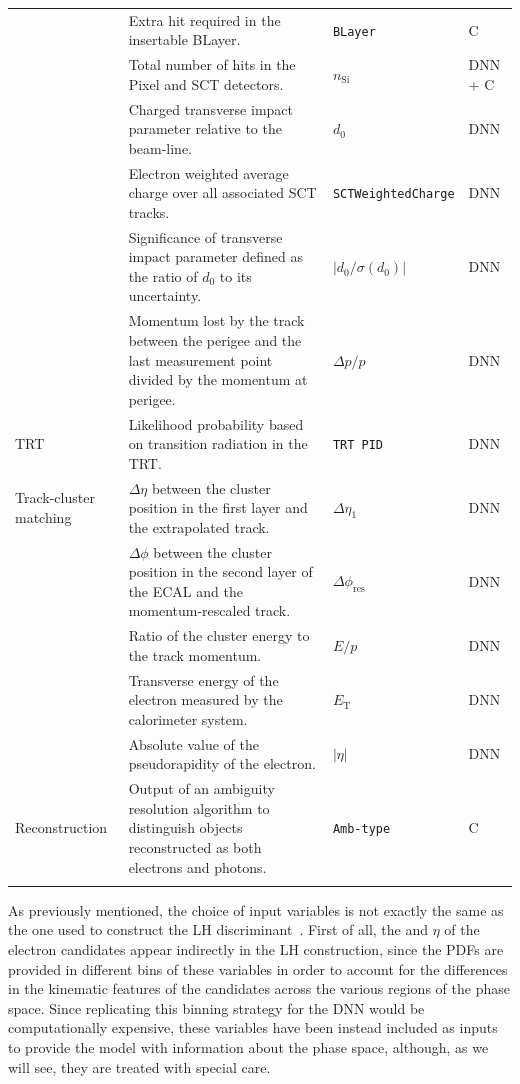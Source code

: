 {\begin{longtable}{p{2.3cm}p{6.5cm}p{1.8cm}p{1.8cm}}
   & Extra hit required in the insertable BLayer. & \texttt{BLayer} & C \\
   & Total number of hits in the Pixel and SCT detectors. & $n_{\text{Si}}$ & DNN + C \\
   & Charged transverse impact parameter relative to the beam-line. & $d_0$ & DNN \\
   & Electron weighted average charge over all associated SCT tracks. & \tiny{\texttt{SCTWeightedCharge}} & DNN \\
   & Significance of transverse impact parameter defined as the ratio of $d_0$ to its uncertainty. & $|d_0/\sigma(d_0)|$ & DNN \\
   & Momentum lost by the track between the perigee and the last measurement point divided by the momentum at perigee. & $\Delta p/p$ & DNN \\
  \midrule
  TRT & Likelihood probability based on transition radiation in the TRT. & \scriptsize{\texttt{TRT PID}} & DNN \\
  \midrule
  Track-cluster matching & $\Delta\eta$ between the cluster position in the first layer and the extrapolated track. & $\Delta\eta_1$ & DNN \\
   & $\Delta\phi$ between the cluster position in the second layer of the ECAL and the momentum-rescaled track. & $\Delta\phi_{\text{res}}$ & DNN \\
   & Ratio of the cluster energy to the track momentum. & $E/p$ & DNN\\
   & Transverse energy of the electron measured by the calorimeter system. & $E_{\text{T}}$ & DNN \\
   & Absolute value of the pseudorapidity of the electron. & $|\eta|$ & DNN \\
  \midrule 
  Reconstruction & Output of an ambiguity resolution algorithm to distinguish objects reconstructed as both electrons and photons. & \scriptsize{\texttt{Amb-type}} & C \\
  \bottomrule
  \label{table:inputs}
\end{longtable}
}
As previously mentioned, the choice of input variables is not exactly the same as the one used to construct the LH discriminant~\cite{Aaboud:2657964}. First of all, the \et and $\eta$ of the electron candidates appear indirectly in the LH construction, since the PDFs are provided in different bins of these variables in order to account for the differences in the kinematic features of the candidates across the various regions of the phase space. Since replicating this binning strategy for the DNN would be computationally expensive, these variables have been instead included as inputs to provide the model with information about the phase space, although, as we will see, they are treated with special care.

